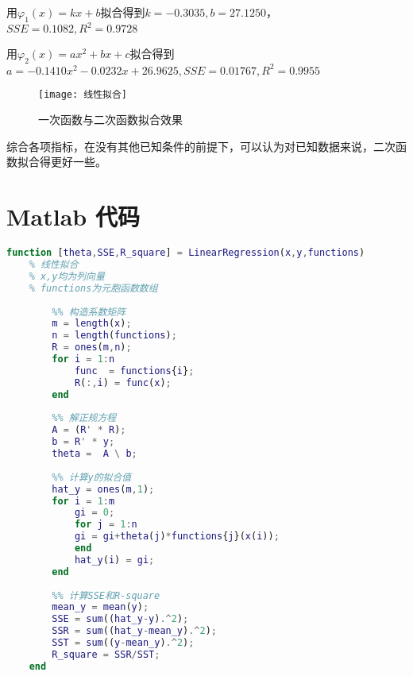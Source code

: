 \documentclass[withoutpreface]{cumcmthesis}
\begin{document}
用$\varphi_1(x) = kx +b$拟合得到$k=-0.3035,b=27.1250$，$SSE = 0.1082,R^2 = 0.9728$

用$\varphi_2(x)=ax^2+bx+c$拟合得到$a=-0.1410x^2-0.0232x+26.9625,SSE=0.01767,R^2=0.9955$

\begin{figure}[H]
    \centering
    \texttt{[image: 线性拟合]}
    \caption{一次函数与二次函数拟合效果}
\end{figure}

综合各项指标，在没有其他已知条件的前提下，可以认为对已知数据来说，二次函数拟合得更好一些。

\appendix
\section{Matlab 代码}
    \begin{lstlisting}[language=matlab ,caption={自定义的线性拟合函数}]
    function [theta,SSE,R_square] = LinearRegression(x,y,functions)
    % 线性拟合
    % x,y均为列向量
    % functions为元胞函数数组
        
        %% 构造系数矩阵
        m = length(x);
        n = length(functions);
        R = ones(m,n);
        for i = 1:n
            func  = functions{i};
            R(:,i) = func(x);
        end
        
        %% 解正规方程
        A = (R' * R);
        b = R' * y;
        theta =  A \ b;
        
        %% 计算y的拟合值
        hat_y = ones(m,1);
        for i = 1:m
            gi = 0;
            for j = 1:n
            gi = gi+theta(j)*functions{j}(x(i));
            end
            hat_y(i) = gi;
        end
        
        %% 计算SSE和R-square
        mean_y = mean(y);
        SSE = sum((hat_y-y).^2);
        SSR = sum((hat_y-mean_y).^2);
        SST = sum((y-mean_y).^2);
        R_square = SSR/SST;
    end
        
        
    \end{lstlisting}
\end{document}
